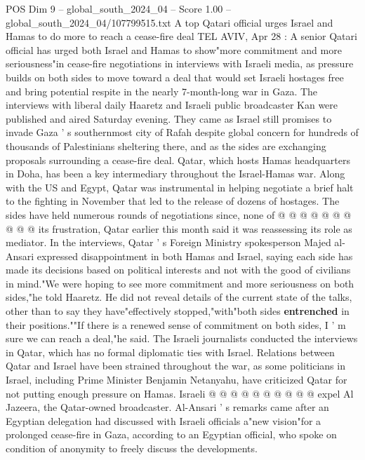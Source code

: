 \begin{textsample}{POS Dim 9 – global\_south\_2024\_04 – Score 1.00 – global\_south\_2024\_04/107799515.txt}  \label{ex:f9_pos_123}
A top Qatari official urges Israel and Hamas to do more to reach a cease-fire deal TEL AVIV, Apr 28 : A senior Qatari official has urged both Israel and Hamas to show"more commitment and more seriousness"in cease-fire negotiations in interviews with Israeli media, as pressure builds on both sides to move toward a deal that would set Israeli hostages free and bring potential respite in the nearly 7-month-long war in Gaza.
The interviews with liberal daily Haaretz and Israeli public broadcaster Kan were published and aired Saturday evening.
They came as Israel still promises to invade Gaza ' s southernmost city of Rafah despite global concern for hundreds of thousands of Palestinians sheltering there, and as the sides are exchanging proposals surrounding a cease-fire deal.
Qatar, which hosts Hamas headquarters in Doha, has been a key intermediary throughout the Israel-Hamas war.
Along with the US and Egypt, Qatar was instrumental in helping negotiate a brief halt to the fighting in November that led to the release of dozens of hostages.
The sides have held numerous rounds of negotiations since, none of @ @ @ @ @ @ @ @ @ @ its frustration, Qatar earlier this month said it was reassessing its role as mediator.
In the interviews, Qatar ' s Foreign Ministry spokesperson Majed al-Ansari expressed disappointment in both Hamas and Israel, saying each side has made its decisions based on political interests and not with the good of civilians in mind."We were hoping to see more commitment and more seriousness on both sides,"he told Haaretz.
He did not reveal details of the current state of the talks, other than to say they have"effectively stopped,"with"both sides \textbf{entrenched} in their positions.""If there is a renewed sense of commitment on both sides, I ' m sure we can reach a deal,"he said.
The Israeli journalists conducted the interviews in Qatar, which has no formal diplomatic ties with Israel.
Relations between Qatar and Israel have been strained throughout the war, as some politicians in Israel, including Prime Minister Benjamin Netanyahu, have criticized Qatar for not putting enough pressure on Hamas.
Israeli @ @ @ @ @ @ @ @ @ @ expel Al Jazeera, the Qatar-owned broadcaster.
Al-Ansari ' s remarks came after an Egyptian delegation had discussed with Israeli officials a"new vision"for a prolonged cease-fire in Gaza, according to an Egyptian official, who spoke on condition of anonymity to freely discuss the developments.

\end{textsample}
